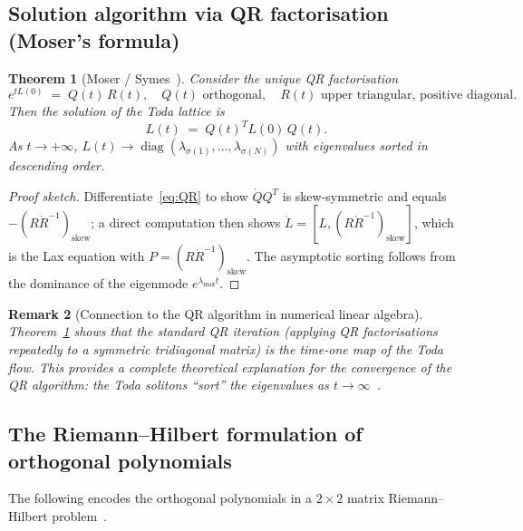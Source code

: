 \documentclass[12pt,a4paper]{article}
\newtheorem{theorem}{Theorem}[section]
\newtheorem{remark}[theorem]{Remark}
\theoremstyle{definition}
\newcommand{\diag}{\operatorname{diag}}
\begin{document}
\subsection{Solution algorithm via QR factorisation (Moser's formula)}

\begin{theorem}[Moser / Symes~\cite{Symes1982,Deift1983}]\label{thm:QR}
Consider the unique QR factorisation
\begin{equation}\label{eq:QR}
  e^{t L(0)} \;=\; Q(t)\,R(t),
  \quad Q(t)\text{ orthogonal},\quad R(t)\text{ upper triangular, positive diagonal.}
\end{equation}
Then the solution of the Toda lattice is
\begin{equation}\label{eq:Mosersol}
  L(t) \;=\; Q(t)^{T} L(0)\, Q(t).
\end{equation}
As $t\to+\infty$, $L(t)\to\diag(\lambda_{\sigma(1)},\ldots,\lambda_{\sigma(N)})$
with eigenvalues sorted in \emph{descending} order.
\end{theorem}

\begin{proof}[Proof sketch]
Differentiate~\eqref{eq:QR} to show $\dot{Q}Q^T$ is skew-symmetric and
equals $-(R\dot{R}^{-1})_{\mathrm{skew}}$; a direct computation then
shows $\dot{L}=[L, (R\dot{R}^{-1})_{\mathrm{skew}}]$, which is the Lax
equation with $P=(R\dot{R}^{-1})_{\mathrm{skew}}$.  The asymptotic
sorting follows from the dominance of the eigenmode $e^{\lambda_{\max} t}$.
\end{proof}

\begin{remark}[Connection to the QR algorithm in numerical linear algebra]
Theorem~\ref{thm:QR} shows that the standard \emph{QR iteration}
(applying QR factorisations repeatedly to a symmetric tridiagonal matrix)
is the \emph{time-one map} of the Toda flow.  This provides a complete
theoretical explanation for the convergence of the QR algorithm: the Toda
solitons ``sort'' the eigenvalues as $t\to\infty$~\cite{Symes1982}.
\end{remark}

\subsection{The Riemann--Hilbert formulation of orthogonal polynomials}

The following encodes the orthogonal polynomials in a $2\times 2$
matrix Riemann--Hilbert problem~\cite{FokasItsKitaev1992}.
\end{document}
